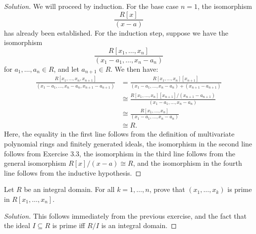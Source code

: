 \documentclass[12pt]{article}
\newenvironment{problem}[2][Problem]{\begin{trivlist}
\item[\hskip \labelsep {\bfseries #1}\hskip \labelsep {\bfseries #2.}]}{\end{trivlist}}
\newenvironment{solution}
  {\renewcommand\qedsymbol{$\blacksquare$}\begin{proof}[Solution]}
{\end{proof}}
\theoremstyle{remark}
\begin{document}
\begin{solution}
  We will proceed by induction.
  For the base case $n=1$, the isomorphism
  \begin{equation*}
    \frac{R[x]}{(x-a)}
  \end{equation*}
  has already been established.
  For the induction step, suppose we have the isomorphism
  \begin{equation*}
    \frac{R[x_1,\dots,x_n]}{(x_1-a_1,\dots,x_n-a_n)}
  \end{equation*}
  for $a_1,\dots,a_n\in R$, and let $a_{n+1}\in R$.
  We then have:
  \begin{align*}
    \frac{R[x_1,\dots,x_n,x_{n+1}]}{(x_1-a_1,\dots,x_n-a_n,x_{n+1}-a_{n+1})}
      &= \frac{R[x_1,\dots,x_n][x_{n+1}]}
      {(x_1-a_1,\dots,x_n-a_n)+(x_{n+1}-a_{n+1})}\\
      &\cong\frac{R[x_1,\dots,x_n][x_{n+1}]/(x_{n+1}-a_{n+1})}
      {(x_1-a_1,\dots,x_n-a_n)}\\
      &\cong \frac{R[x_1,\dots,x_n]}{(x_1-a_1,\dots,x_n-a_n)}\\
      &\cong R.
  \end{align*}
  \indent Here,  the equality in the first line follows from the definition
  of multivariate polynomial rings and finitely generated ideals,
  the isomorphism in the second line follows from Exercise 3.3,
  the isomorphism in the third line follows from the general isomorphism
  $R[x]/(x-a)\cong R$, and the isomorphism in the fourth line
  follows from the inductive hypothesis.
\end{solution}

\begin{problem}{4.13}
  Let $R$ be an integral domain.
  For all $k=1,\dots,n$, prove that $(x_1,\dots,x_k)$ is
  prime in $R[x_1,\dots,x_n]$.
\end{problem}
\begin{solution}
  This follows immediately from the previous exercise, and the fact that 
  the ideal $I\subseteq R$ is prime iff $R/I$ is an integral domain.
\end{solution}
\end{document}
